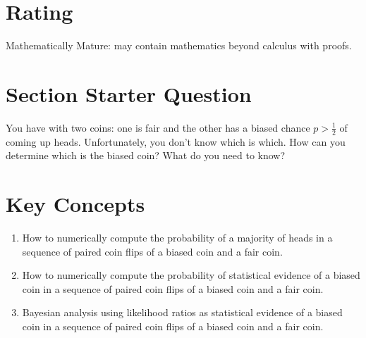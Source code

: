 \documentclass[12pt]{article}
\begin{document}
\myheader \mytitle

\hr


\hr

\usefirefox

\hr



\section*{Rating} %
Mathematically Mature:  may contain mathematics beyond calculus with
proofs.  %

\hr

\section*{Section Starter Question}

You have with two coins:  one is fair and the other has a biased chance \(
p > \frac{1}{2} \) of coming up heads.  Unfortunately, you don't know
which is which.  How can you determine which is the biased coin?  What
do you need to know?

\hr

\section*{Key Concepts}

\begin{enumerate}
    \item
        How to numerically compute the probability of a majority of
        heads in a sequence of paired coin flips of a biased coin and a
        fair coin.
    \item
        How to numerically compute the probability of statistical
        evidence of a biased coin in a sequence of paired coin flips of
        a biased coin and a fair coin.
    \item
        Bayesian analysis using likelihood ratios as statistical
        evidence of a biased coin in a sequence of paired coin flips of
        a biased coin and a fair coin.
\end{enumerate}
\end{document}
